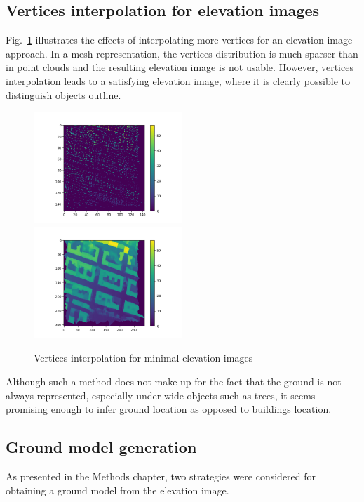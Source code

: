 \documentclass{kththesis}
\begin{document}
\subsection{Vertices interpolation for elevation images}
Fig.~\ref{fig:vertices_generation} illustrates the effects of interpolating more vertices for an elevation image approach. In a mesh representation, the vertices distribution is much sparser than in point clouds and the resulting elevation image is not usable. However, vertices interpolation leads to a satisfying elevation image, where it is clearly possible to distinguish objects outline. 
\begin{figure}[H]
        \includegraphics[width=0.5\textwidth]{images/Results/minimal_vertices.png} ~ \includegraphics[width=0.5\textwidth]{images/Results/minimal_z_1msquare.png}
    
    \caption{Vertices interpolation for minimal elevation images}
    \label{fig:vertices_generation}
\end{figure}
Although such a method does not make up for the fact that the ground is not always represented, especially under wide objects such as trees, it seems promising enough to infer ground location as opposed to buildings location.

\subsection{Ground model generation}
As presented in the Methods chapter, two strategies were considered for obtaining a ground model from the elevation image. 
\end{document}
